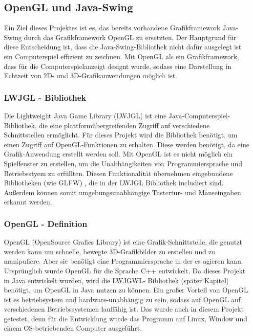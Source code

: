 \subsection{OpenGL und Java-Swing}

Ein Ziel dieses Projektes ist es, das bereits vorhandene Grafikframework Java-Swing durch das Grafikframework OpenGL zu ersetzten. Der Hauptgrund für diese Entscheidung ist, dass die Java-Swing-Bibliothek nicht dafür ausgelegt ist ein Computerspiel effizient zu zeichnen. Mit OpenGL als ein Grafikframework, dass für die Computerspielanzeigt designt wurde, sodass eine Darstellung in Echtzeit von 2D-  und 3D-Grafikanwendungen möglich ist.

\subsubsection{LWJGL - Bibliothek}

Die Lightweight Java Game Library (LWJGL) ist eine Java-Computerspiel-Bibliothek, die eine plattformübergreifenden Zugriff auf verschiedene Schnittstellen ermöglicht. Für dieses Projekt wird die Bibliothek benötigt, um einen Zugriff auf OpenGL-Funktionen zu erhalten. Diese werden benötigt, da eine Grafik-Anwendung erstellt werden soll. Mit OpenGL ist es nicht möglich ein Spielfenster zu erstellen, um die Unabhängikeiten von Programmiersprache und Betriebsstyem zu erfüllten. Diesen Funktionalität übernehmen eingebundene Bibliotheken (wie GLFW) , die in der LWJGL Bibliothek includiert sind. Außerdem können somit umgebungsunabhängige Tastertur- und Mauseingaben erkannt werden.

\subsubsection{OpenGL - Definition}

OpenGL (OpenSource Grafics Library) ist eine Grafik-Schnittstelle, die genutzt werden kann um schnelle, bewegte 3D-Grafikbilder zu erstellen und zu manipuliere. Aber sie benötigt eine Programmiersprache in der es agieren kann. Ursprünglich wurde OpenGL für die Sprache C++ entwickelt. Da dieses Projekt in Java entwickelt wurden, wird die LWJGWL- Bibliothek (später Kapitel) benötigt, um OpenGL in Java nutzen zu können.
Ein großer Vorteil von OpenGL ist es betriebsystem und hardware-unabhängig zu sein, sodass auf OpenGL auf verschiedenen Betriebssystemen lauffähig ist. Das wurde auch in diesem Projekt getestet, denn für die Entwicklung wurde das Programm auf Linux, Window und einem OS-betriebenden Computer ausgeführt.

